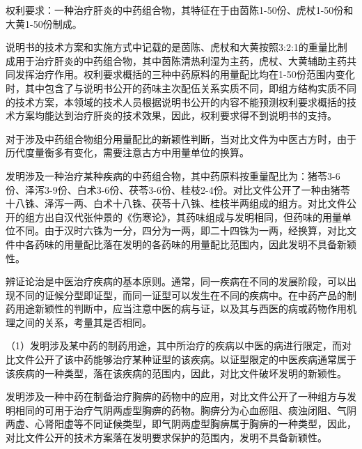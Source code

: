 {\par}

权利要求：一种治疗肝炎的中药组合物，其特征在于由茵陈1-50份、虎杖1-50份和大黄1-50份制成。

说明书的技术方案和实施方式中记载的是茵陈、虎杖和大黄按照3:2:1的重量比制成用于治疗肝炎的中药组合物，其中茵陈清热利湿为主药，虎杖、大黄辅助主药共同发挥治疗作用。权利要求概括的三种中药原料的用量配比均在1-50份范围内变化时，其中包含了与说明书公开的药味主次配伍关系实质不同，即组方结构实质不同的技术方案，本领域的技术人员根据说明书公开的内容不能预测权利要求概括的技术方案均能达到治疗肝炎的技术效果，因此，权利要求得不到说明书的支持。

对于涉及中药组合物组分用量配比的新颖性判断，当对比文件为中医古方时，由于历代度量衡多有变化，需要注意古方中用量单位的换算。

{\par}

发明涉及一种治疗某种疾病的中药组合物，其中药原料按重量配比为：猪苓3-6份、泽泻3-9份、白术3-6份、茯苓3-6份、桂枝2-4份。对比文件公开了一种由猪苓十八铢、泽泻一两、白术十八铢、茯苓十八铢、桂枝半两组成的组方。对比文件公开的组方出自汉代张仲景的《伤寒论》，其药味组成与发明相同，但药味的用量单位不同。由于汉时六铢为一分，四分为一两，即二十四铢为一两，经换算，对比文件中各药味的用量配比落在发明的各药味的用量配比范围内，因此发明不具备新颖性。

辨证论治是中医治疗疾病的基本原则。通常，同一疾病在不同的发展阶段，可以出现不同的证候分型即证型，而同一证型可以发生在不同的疾病中。在中药产品的制药用途新颖性的判断中，应当注意中医的病与证，以及其与西医的病或药物作用机理之间的关系，考量其是否相同。

{\setlength{\parindent}{17.1bp}（1）发明涉及某中药的制药用途，其中所治疗的疾病以中医的病进行限定，而对比文件公开了该中药能够治疗某种证型的该疾病。以证型限定的中医疾病通常属于该疾病的一种类型，落在该疾病的范围内，因此，对比文件破坏发明的新颖性。\par}

{\par}

发明涉及一种中药在制备治疗胸痹的药物中的应用，对比文件公开了一种组方与发明相同的可用于治疗气阴两虚型胸痹的药物。胸痹分为心血瘀阻、痰浊闭阻、气阴两虚、心肾阳虚等不同证候类型，即气阴两虚型胸痹属于胸痹的一种类型，因此，对比文件公开的技术方案落在发明要求保护的范围内，发明不具备新颖性。


